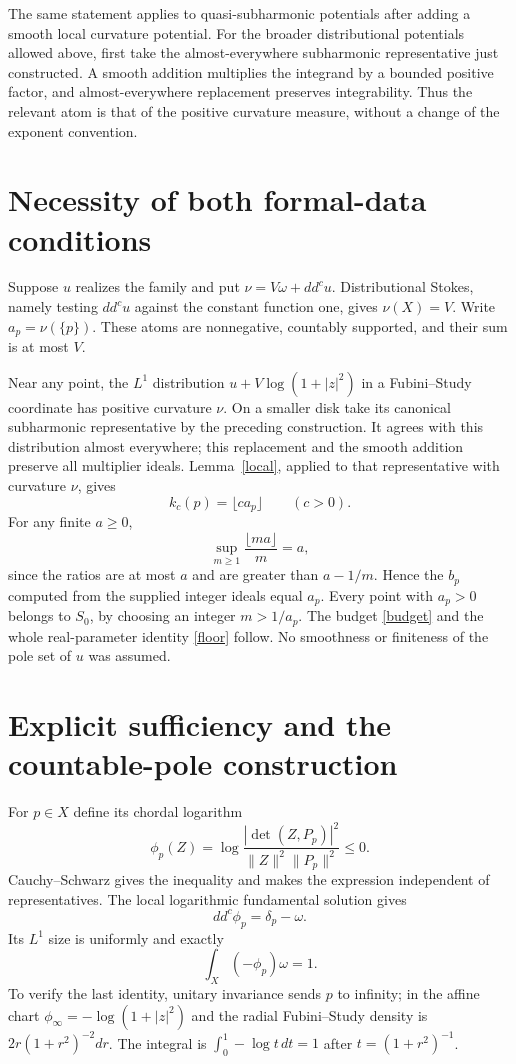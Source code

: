 \documentclass[11pt]{article}
\begin{document}
The same statement applies to quasi-subharmonic potentials after adding a smooth local curvature potential. For the broader distributional potentials allowed above, first take the almost-everywhere subharmonic representative just constructed. A smooth addition multiplies the integrand by a bounded positive factor, and almost-everywhere replacement preserves integrability. Thus the relevant atom is that of the positive curvature measure, without a change of the exponent convention.

\section{Necessity of both formal-data conditions}
Suppose $u$ realizes the family and put $\nu=V\omega+dd^cu$. Distributional Stokes, namely testing $dd^cu$ against the constant function one, gives $\nu(X)=V$. Write $a_p=\nu(\{p\})$. These atoms are nonnegative, countably supported, and their sum is at most $V$.

Near any point, the $L^1$ distribution $u+V\log(1+|z|^2)$ in a Fubini--Study coordinate has positive curvature $\nu$. On a smaller disk take its canonical subharmonic representative by the preceding construction. It agrees with this distribution almost everywhere; this replacement and the smooth addition preserve all multiplier ideals. Lemma~\ref{local}, applied to that representative with curvature $\nu$, gives
\[
 k_c(p)=\lfloor c a_p\rfloor \qquad(c>0).
\]
For any finite $a\geq0$,
\[
 \sup_{m\geq1}\frac{\lfloor ma\rfloor}{m}=a,
\]
since the ratios are at most $a$ and are greater than $a-1/m$. Hence the $b_p$ computed from the supplied integer ideals equal $a_p$. Every point with $a_p>0$ belongs to $S_0$, by choosing an integer $m>1/a_p$. The budget \eqref{budget} and the whole real-parameter identity \eqref{floor} follow. No smoothness or finiteness of the pole set of $u$ was assumed.

\section{Explicit sufficiency and the countable-pole construction}
For $p\in X$ define its chordal logarithm
\[
 \phi_p(Z)=\log\frac{|\det(Z,P_p)|^2}{\|Z\|^2\|P_p\|^2}\leq0.
\]
Cauchy--Schwarz gives the inequality and makes the expression independent of representatives. The local logarithmic fundamental solution gives
\[
 dd^c\phi_p=\delta_p-\omega.
\]
Its $L^1$ size is uniformly and exactly
\[
 \int_X(-\phi_p)\omega=1.
\]
To verify the last identity, unitary invariance sends $p$ to infinity; in the affine chart $\phi_\infty=-\log(1+|z|^2)$ and the radial Fubini--Study density is $2r(1+r^2)^{-2}dr$. The integral is $\int_0^1-\log t\,dt=1$ after $t=(1+r^2)^{-1}$.
\end{document}
